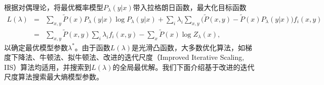 根据对偶理论，将最优概率模型$P_\lambda(y|x)$带入拉格朗日函数，最大化目标函数
\begin{equation}\label{eq:dualmaximum}
    \begin{array}{lcl}
        L(\lambda) & = &\sum\limits_{x,y} \tilde{P}(x) P_\lambda(y|x) \log P_\lambda(y|x) + \sum\limits_i \lambda_i \sum\limits_{x,y} \Big(\tilde P(x,y)-\tilde{P}(x) P_\lambda(y|x) \Big) f_i(x,y)\\
        & = & \sum\limits_{x,y} \tilde P(x,y) \sum\limits_i \lambda_i f_i(x,y) -\sum\limits_x \tilde P(x) \log Z_\lambda(x),
    \end{array}
\end{equation}
以确定最优模型参数$\lambda^*$。由于函数$L(\lambda)$是光滑凸函数，大多数优化算法，如梯度下降法、牛顿法、拟牛顿法、改进的迭代尺度（Improved Iterative Scaling, IIS）算法均适用，并搜索到$L(\lambda)$的全局最优解。我们下面介绍基于改进的迭代尺度算法搜索最大熵模型参数。

